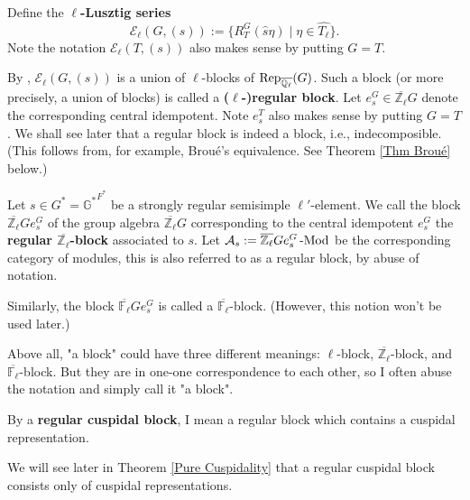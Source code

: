 	Define the \textbf{$\ell$-Lusztig series} 
	$$\mathcal{E}_\ell(G, (s)):=\{R_T^G(\hat{s}\eta)\;|\; \eta \in \widehat{T_\ell}\}.$$ Note the notation $\mathcal{E}_\ell(T, (s))$ also makes sense by putting $G=T$.
	
	By \cite{michel1989bloc}, $\mathcal{E}_\ell(G, (s))$ is a union of $\ell$-blocks of $\operatorname{\operatorname{Rep}}_{\overline{\mathbb{Q}_\ell}}(G)$. Such a block (or more precisely, a union of blocks) is called a \textbf{($\ell$-)regular block}. Let $e_s^G \in \overline{\mathbb{Z}_\ell}G$ denote the corresponding central idempotent. Note $e_s^T$ also makes sense by putting $G=T$. We shall see later that a regular block is indeed a block, i.e., indecomposible. (This follows from, for example, Broué's equivalence. See Theorem \ref{Thm Broué} below.)
	
	\begin{definition}\label{Def Regular Block}
		Let $s \in G^*={\mathbb{G}^*}^{F^*}$ be a strongly regular semisimple $\ell'$-element.
		We call the block $\overline{\mathbb{Z}_\ell}Ge_s^G$ of the group algebra $\overline{\mathbb{Z}_\ell}G$ corresponding to the central idempotent $e_s^G$ the \textbf{regular $\overline{\mathbb{Z}_\ell}$-block} associated to $s$. Let $\mathcal{A}_s:=\overline{\mathbb{Z}_\ell}Ge_s^G\operatorname{-Mod}$ be the corresponding category of modules, this is also referred to as a regular block, by abuse of notation.
		
		Similarly, the block $\overline{\mathbb{F}_\ell}Ge_s^G$ is called a $\overline{\mathbb{F}_{\ell}}$-block. (However, this notion won't be used later.)
	
	\end{definition}
	
	\begin{remark}
		Above all, "a block" could have three different meanings: $\ell$-block, $\overline{\mathbb{Z}_{\ell}}$-block, and $\overline{\mathbb{F}_{\ell}}$-block. But they are in one-one correspondence to each other, so I often abuse the notation and simply call it "a block".
	\end{remark}
	
	\begin{definition}
		By a \textbf{regular cuspidal block}, I mean a regular block which contains a cuspidal representation.
	\end{definition}
	
	\begin{remark}
		We will see later in Theorem \ref{Pure Cuspidality} that a regular cuspidal block consists only of cuspidal representations.
	\end{remark}
	

